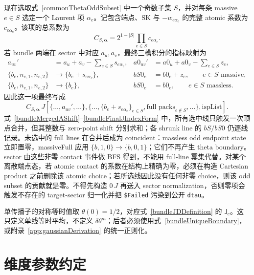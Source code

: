 ﻿\documentclass[a4paper,11pt]{article}
\begin{document}
现在选取式~\eqref{commonThetaOddSubset} 中一个奇数子集 $S$，并对每条 massive $e\in S$ 选定一个 Laurent 项 $\alpha_e$。记包含端点、SK 与 $-w_{e\alpha_e}$ 的完整 atomic 系数为 $c_{e\alpha_e}$。该项的总系数为
\begin{equation}
 C_{S,\boldsymbol\alpha}
 =2^{1-|S|}\prod_{e\in S}c_{e\alpha_e}.
 \label{bundleIndexCoefficient}
\end{equation}
若 bundle 两端在 sector 中对应 $a_u,a_v$，最终三槽积分的指标映射为
\begin{align}
 a_{uv}'&=a_u+a_v-\sum_{e\in S}s_{e\alpha_e},
 &
 a0_{uv}'&=a0_u+a0_v-\sum_{e\in S}z_e,
 \label{bundleMergedAShift}\\
 \{b_e,n_{e,1},n_{e,2}\}&\longrightarrow\{b_e+s_{e\alpha_e}\},
 &
 bS0_e&=b0_e+z_e,
 \qquad e\in S\text{ massive},
 \label{bundleMassivePackShift}\\
 \{b_e,n_{e,1},n_{e,2}\}&\longrightarrow\{b_e\},
 &
 bS0_e&=b0_e,
 \qquad e\in S\text{ massless}.
 \label{bundleMasslessPackShift}
\end{align}
因此这一项最终写成
\begin{equation}
 C_{S,\boldsymbol\alpha}\,
 J\!\left[
  \{\ldots,a_{uv}',\ldots\},
  \{\ldots,\{b_e+s_{e\alpha_e}\}_{e\in S},
          \text{full packs}_{e\notin S},\ldots\},
  \mathrm{ispList}
 \right].
 \label{bundleFinalJIndexForm}
\end{equation}
式~\eqref{bundleMergedAShift}--\eqref{bundleFinalJIndexForm} 中，所有选中线只触发一次顶点合并，但其整数与 zero-point shift 分别求和；各 shrunk line 的 $bS/bS0$ 仍逐线记录。未选中的 full lines 在合并后成为 coincident：massless odd endpoint state 立即置零，massiveFull 应用 $\{b,1,0\}\to\{b,0,1\}$；它们不再产生 theta boundary。sector 由这些非零 contact 事件做 BFS 得到，不能用 full-line 幂集代替。对某个离散端点态，若 atomic contact 的系数在结构上精确为零，必须在构造 Cartesian product 之前删除该 atomic choice；若所选线因此没有任何非零 choice，则该 odd subset 的贡献就是零。不得先构造 $0\,J$ 再送入 sector normalization，否则零项会触发不存在的 target-sector 归一化并把 \texttt{\$Failed} 污染到公开 \texttt{dtau}。

单传播子的对称等时值取 $\theta(0)=1/2$，对应式~\eqref{bundleJDDefinition} 的 $\mathsf J_e$。这只定义单线等时平均，不定义 $\delta\theta^m$；后者必须使用式~\eqref{bundleUniqueBoundary}，或附录~\ref{app:gaussianDerivation} 的统一正则化。
\section{维度参数约定}
\end{document}
